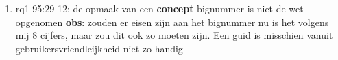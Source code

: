 \begin{enumerate}
    \item rq1-95:29-12: de opmaak van een \textbf{concept} bignummer  is niet de wet opgenomen
    \newline\textbf{obs}: zouden er eisen zijn aan het bignummer nu is het volgens mij 8 cijfers, maar zou dit ook zo moeten zijn. 
    Een guid is misschien vanuit gebruikersvriendleijkheid niet zo handig
\end{enumerate}


\newpage
